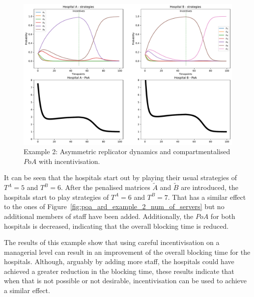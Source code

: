\begin{figure}[H]
    \centering
    \includegraphics[width=\linewidth]{chapters/05_numerical_results/Bin/example_2/poa_ard_example_2_penalty.pdf}
    \caption{Example 2: Asymmetric replicator dynamics and compartmentalised
    \(PoA\) with incentivisation.}
    \label{fig:poa_ard_example_2_penalty}
\end{figure}

It can be seen that the hospitals start out by playing their usual strategies
of \(T^A = 5\) and \(T^B = 6\).
After the penalised matrices \(\tilde{A}\) and \(\tilde{B}\) are introduced,
the hospitals start to play strategies of \(T^A = 6\) and \(T^B = 7\).
That has a similar effect to the ones of
Figure~\ref{fig:poa_ard_example_2_num_of_servers} but no additional members of
staff have been added.
Additionally, the \(PoA\) for both hospitals is decreased, indicating that
the overall blocking time is reduced.

The results of this example show that using careful incentivisation on a
managerial level can result in an improvement of the overall blocking time
for the hospitals.
Although, arguably by adding more staff, the hospitals could have achieved
a greater reduction in the blocking time, these results indicate that when
that is not possible or not desirable, incentivisation can be used to
achieve a similar effect.

